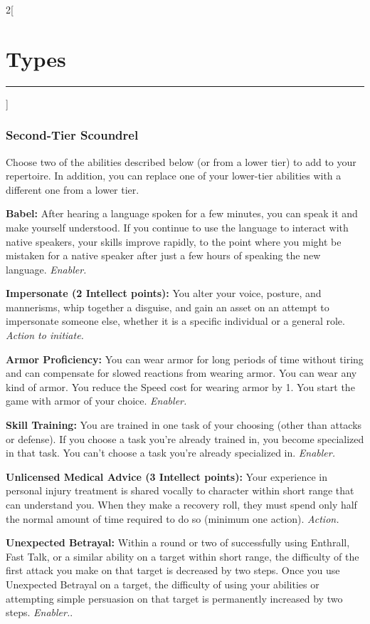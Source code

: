 \documentclass[a4paper,10pt,final]{book}
\newcommand{\HRule}{\rule{\linewidth}{0.5mm}} %
\newcommand{\newSection}[1]{\section*{#1} \addcontentsline{toc}{section}{#1} \label{sec:#1} \HRule}
\newcommand{\itemAbility}[2]{\textcolor{25gray}{\textbullet\textbf{ #1:}} {#2}\par}
\newcommand{\enabler}{\textit{ Enabler.}}
\newcommand{\action}{\textit{ Action.}}
\newcommand{\actionInit}{\textit{ Action to initiate.}}
\newenvironment{docsection}[1]
{
  \begin{multicols*}{2}[\newSection{#1}]
}
{
  \end{multicols*}
  \newpage
}
\begin{document}
\begin{docsection}{Types}

\subsubsection*{Second-Tier Scoundrel}
\label{subsub:scoundrelSecondTier}

Choose two of the abilities described
below (or from a lower tier) to add to your
repertoire. In addition, you can replace one
of your lower-tier abilities with a different
one from a lower tier.\par

\itemAbility{Babel}{After hearing a language spoken
for a few minutes, you can speak it and
make yourself understood. If you continue
to use the language to interact with native
speakers, your skills improve rapidly, to
the point where you might be mistaken for
a native speaker after just a few hours of
speaking the new language.\enabler}

\itemAbility{Impersonate (2 Intellect points)}{You alter
your voice, posture, and mannerisms, whip
together a disguise, and gain an asset on
an attempt to impersonate someone else,
whether it is a specific individual or a general role.\actionInit}

\itemAbility{Armor Proficiency}{You can wear armor
for long periods of time without tiring
and can compensate for slowed reactions
from wearing armor. You can wear any kind
of armor. You reduce the Speed cost for
wearing armor by 1. You start the game with
armor of your choice.\enabler}

\itemAbility{Skill Training}{You are trained in one task of your
choosing (other than attacks or defense). If
you choose a task you’re already trained in,
you become specialized in that task. You can’t
choose a task you’re already specialized in.\enabler}

\itemAbility{Unlicensed Medical Advice (3 Intellect points)}{Your experience in personal injury treatment is shared vocally to character within short range that can understand you.
When they make a recovery roll, they must spend only half the
normal amount of time required to do so
(minimum one action).\action}

\itemAbility{Unexpected Betrayal}{Within a round or
two of successfully using Enthrall, Fast Talk,
or a similar ability on a target within short
range, the difficulty of the first attack you
make on that target is decreased by two
steps. Once you use Unexpected Betrayal
on a target, the difficulty of using your
abilities or attempting simple persuasion on
that target is permanently increased by two
steps.\enabler.}


\end{docsection}
\end{document}
